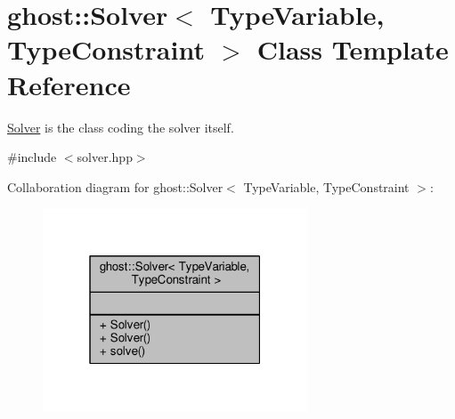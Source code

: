 \hypertarget{classghost_1_1Solver}{}\section{ghost\+:\+:Solver$<$ Type\+Variable, Type\+Constraint $>$ Class Template Reference}
\label{classghost_1_1Solver}


\hyperlink{classghost_1_1Solver}{Solver} is the class coding the solver itself.  




{\ttfamily \#include $<$solver.\+hpp$>$}



Collaboration diagram for ghost\+:\+:Solver$<$ Type\+Variable, Type\+Constraint $>$\+:\nopagebreak
\begin{figure}[H]
\begin{center}
\leavevmode
\includegraphics[width=223pt]{classghost_1_1Solver__coll__graph}
\end{center}
\end{figure}
